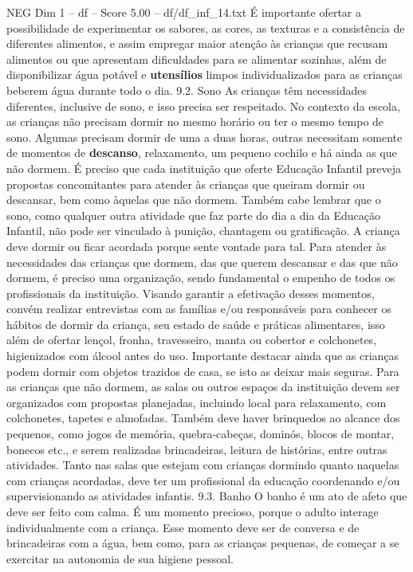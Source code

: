 \begin{textsample}{NEG Dim 1 – df – Score 5.00 – df/df\_inf\_14.txt}
É importante ofertar a possibilidade de experimentar os sabores, as cores, as texturas e a consistência de diferentes alimentos, e assim empregar maior atenção às crianças que recusam alimentos ou que apresentam dificuldades para se alimentar sozinhas, além de disponibilizar água potável e \textbf{utensílios} limpos individualizados para as crianças beberem água durante todo o dia. 9.2.
Sono As crianças têm necessidades diferentes, inclusive de sono, e isso precisa ser respeitado.
No contexto da escola, as crianças não precisam dormir no mesmo horário ou ter o mesmo tempo de sono.
Algumas precisam dormir de uma a duas horas, outras necessitam somente de momentos de \textbf{descanso}, relaxamento, um pequeno cochilo e há ainda as que não dormem.
É preciso que cada instituição que oferte Educação Infantil preveja propostas concomitantes para atender às crianças que queiram dormir ou descansar, bem como àquelas que não dormem.
Também cabe lembrar que o sono, como qualquer outra atividade que faz parte do dia a dia da Educação Infantil, não pode ser vinculado à punição, chantagem ou gratificação.
A criança deve dormir ou ficar acordada porque sente vontade para tal.
Para atender às necessidades das crianças que dormem, das que querem descansar e das que não dormem, é preciso uma organização, sendo fundamental o empenho de todos os profissionais da instituição.
Visando garantir a efetivação desses momentos, convém realizar entrevistas com as famílias e/ou responsáveis para conhecer os hábitos de dormir da criança, seu estado de saúde e práticas alimentares, isso além de ofertar lençol, fronha, travesseiro, manta ou cobertor e colchonetes, higienizados com álcool antes do uso.
Importante destacar ainda que as crianças podem dormir com objetos trazidos de casa, se isto as deixar mais seguras.
Para as crianças que não dormem, as salas ou outros espaços da instituição devem ser organizados com propostas planejadas, incluindo local para relaxamento, com colchonetes, tapetes e almofadas.
Também deve haver brinquedos ao alcance dos pequenos, como jogos de memória, quebra-cabeças, dominós, blocos de montar, bonecos etc., e serem realizadas brincadeiras, leitura de histórias, entre outras atividades.
Tanto nas salas que estejam com crianças dormindo quanto naquelas com crianças acordadas, deve ter um profissional da educação coordenando e/ou supervisionando as atividades infantis. 9.3.
Banho O banho é um ato de afeto que deve ser feito com calma.
É um momento precioso, porque o adulto interage individualmente com a criança.
Esse momento deve ser de conversa e de brincadeiras com a água, bem como, para as crianças pequenas, de começar a se exercitar na autonomia de sua higiene pessoal.

\end{textsample}
